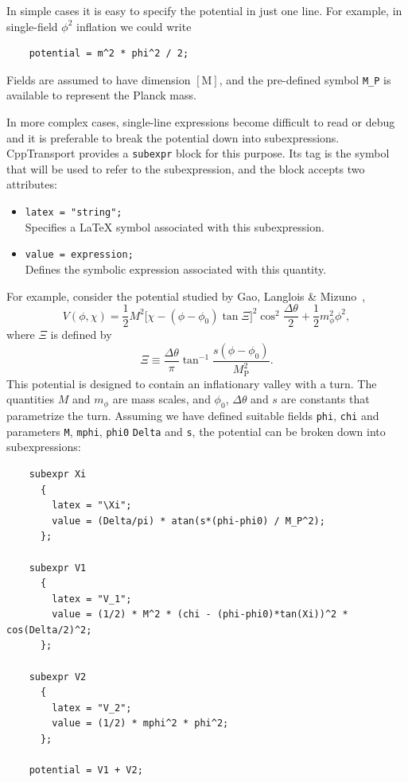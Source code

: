 \documentclass[11pt,a4paper]{article}
\newcommand{\Mp}{M_{\mathrm{P}}}
\newcommand{\packagefont}{\sffamily}
\newcommand{\CppTransport}{{\packagefont CppTransport}}
\newcommand{\block}[1]{\texttt{#1}}
\newcommand{\attribute}[1]{\texttt{#1}}
\newcommand{\descfile}[1]{\texttt{#1}}
\begin{document}
In simple cases it is easy to specify the potential in just one line.
For example, in single-field $\phi^2$ inflation we could write
\begin{verbatim}
    potential = m^2 * phi^2 / 2;
\end{verbatim}
Fields are assumed to have dimension $[\mathrm{M}]$,
and the pre-defined symbol \descfile{M_P} is available to represent
the Planck mass.

In more complex cases, single-line expressions become difficult to read
or debug and it is preferable to break the potential down into subexpressions.
{\CppTransport} provides a \block{subexpr} block for this purpose.
Its tag is the symbol that will be used to refer to the subexpression,
and the block accepts two attributes:
\begin{itemize}
    \item \attribute{latex = "string";} \\
    Specifies a {\LaTeX} symbol associated with this subexpression.
    
    \item \attribute{value = expression;} \\
    Defines the symbolic expression
    associated with this quantity.
\end{itemize}
For example, consider the potential studied
by Gao, Langlois \& Mizuno~\cite{Gao:2012uq},
\begin{equation}
    V(\phi, \chi)
    =
        \frac{1}{2} M^2
        \big[
            \chi - (\phi - \phi_0) \tan \Xi
        \big]^2
        \cos^2 \frac{\Delta\theta}{2}
        +
        \frac{1}{2} m_\phi^2 \phi^2 ,
\end{equation}
where $\Xi$ is defined by
\begin{equation}
    \Xi \equiv \frac{\Delta\theta}{\pi}
    \tan^{-1}
    \frac{s(\phi - \phi_0)}{\Mp^2} .
\end{equation}
This potential is designed to contain an inflationary
valley with a turn.
The quantities $M$ and $m_\phi$ are mass scales, and
$\phi_0$, $\Delta\theta$ and $s$ are
constants that parametrize the turn.
Assuming we have defined
suitable fields \descfile{phi}, \descfile{chi}
and parameters \descfile{M}, \descfile{mphi}, \descfile{phi0}
\descfile{Delta} and \descfile{s},
the potential can be broken down into subexpressions:
\begin{verbatim}
    subexpr Xi
      {
        latex = "\Xi";
        value = (Delta/pi) * atan(s*(phi-phi0) / M_P^2);
      };
    
    subexpr V1
      {
        latex = "V_1";
        value = (1/2) * M^2 * (chi - (phi-phi0)*tan(Xi))^2 * cos(Delta/2)^2;
      };
    
    subexpr V2
      {
        latex = "V_2";
        value = (1/2) * mphi^2 * phi^2;
      };
    
    potential = V1 + V2;
\end{verbatim}
\end{document}

